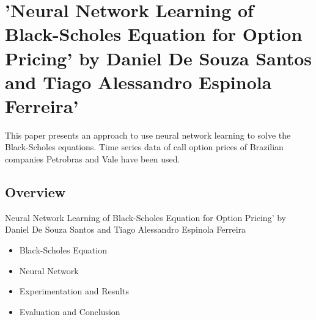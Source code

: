 \section{'Neural Network Learning of Black-Scholes Equation for Option Pricing' by Daniel De Souza Santos and Tiago Alessandro Espinola Ferreira'}

This paper presents an approach to use neural network learning to solve the Black-Scholes equations. 
Time series data of call option prices of Brazilian companies Petrobras and Vale have been used. 

\subsection{Overview}
\begin{frame}{Neural Network Learning of Black-Scholes Equation for Option Pricing' by Daniel De Souza Santos and Tiago Alessandro Espinola Ferreira}
    \begin{itemize}[<+-| alert@+>] %
        \item Black-Scholes Equation
        \item Neural Network
        \item Experimentation and Results
        \item Evaluation and Conclusion
    \end{itemize}
\end{frame}

